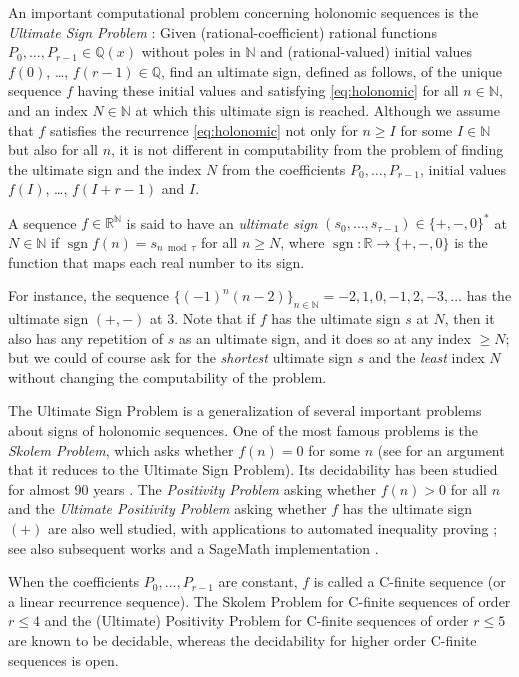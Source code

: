 \documentclass[a4paper,UKenglish,cleveref,autoref,thm-restate]{lipics-v2021}
\newcommand{\R}{\mathbb{R}}
\newcommand{\N}{\mathbb{N}}
\newcommand{\Q}{\mathbb{Q}}
\DeclareMathOperator{\sgn}{sgn}
\begin{document}
An important computational problem concerning holonomic sequences 
is the \emph{Ultimate Sign Problem} \cite{NOW21}: 
Given (rational-coefficient) rational functions $P_0, \dots, P_{r-1} \in \Q(x)$ without poles in $\N$ 
and (rational-valued) initial values $f(0)$, \dots, $f(r-1) \in \Q$, 
find an ultimate sign, defined as follows, of the unique sequence $f$ 
having these initial values and satisfying \eqref{eq:holonomic} for all $n \in \N$, 
and an index $N \in \N$ at which this ultimate sign is reached. 
Although we assume that $f$ satisfies the recurrence \eqref{eq:holonomic} not only for $n \geq I$ for some $I \in \N$ but also for all $n$, it is not different in computability from the problem of finding the ultimate sign and the index $N$ from the coefficients $P_0, \dots, P_{r-1}$, initial values $f(I)$, \dots, $f(I+r-1)$ and $I$. 

\begin{definition}
A sequence $f \in \R^{\N}$ is said to have an
\emph{ultimate sign} $(s_0, \dots, s_{\tau-1}) \in \{ +, -, 0 \} ^*$ 
at $N \in \N$
if $\sgn f(n) = s_{n \bmod \tau}$ for all $n \geq N$, 
where $\sgn \colon \R \to \{ +, -, 0 \}$ is the function that maps each real number to its sign. 
\end{definition}

For instance, the sequence $\{ (-1)^n (n-2) \}_{n \in \N} = -2, 1, 0, -1, 2, -3, \dots$ has 
the ultimate sign $(+, -)$ at $3$.
Note that if $f$ has the ultimate sign $s$ at $N$, 
then it also has any repetition of $s$ as an ultimate sign, and it does so at any index $\geq N$; 
but we could of course ask for the \emph{shortest} ultimate sign $s$ and the \emph{least} index $N$ 
without changing the computability of the problem. 


The Ultimate Sign Problem is a generalization of several important problems about signs of holonomic sequences.
One of the most famous problems is the \emph{Skolem Problem}, 
which asks whether $f(n) = 0$ for some $n$ 
(see \cite[\S~4]{OW12} for an argument that it reduces to the Ultimate Sign Problem). 
Its decidability has been studied for almost 90 years \cite{HHHK05}. 
The \emph{Positivity Problem} asking whether $f(n) > 0$ for all $n$ and 
the \emph{Ultimate Positivity Problem} asking whether $f$ has the ultimate sign $(+)$ 
are also well studied, with applications to automated inequality proving \cite{GK05}; 
see also subsequent works \cite{KP10,Pil13,PS15}
and a SageMath implementation \cite{Nus22}. 

When the coefficients $P_0, \dots, P_{r-1}$ are constant, $f$ is called a C-finite sequence (or a linear recurrence sequence). 
The Skolem Problem for C-finite sequences of order $r \leq 4$ \cite{Tij84,Ver85} and 
the (Ultimate) Positivity Problem for C-finite sequences of order $r \leq 5$ \cite{OW14} 
are known to be decidable, whereas the decidability for higher order C-finite sequences is open. 
\end{document}
